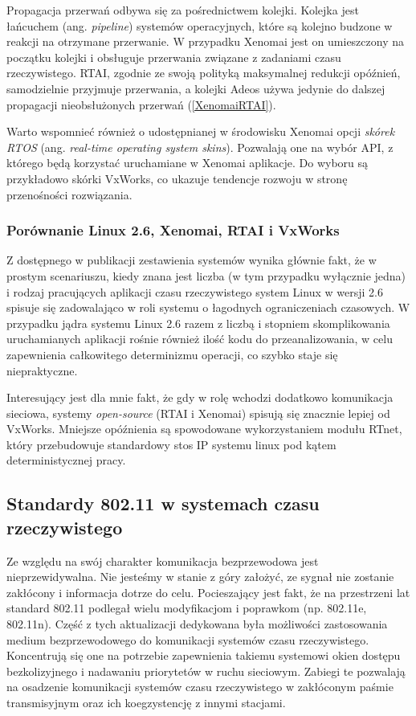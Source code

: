 Propagacja przerwań odbywa się za pośrednictwem kolejki. Kolejka jest łańcuchem (ang. \emph{pipeline}) systemów operacyjnych, które są kolejno budzone w reakcji na otrzymane przerwanie. W przypadku Xenomai jest on umieszczony na początku kolejki i obsługuje przerwania związane z zadaniami czasu rzeczywistego. RTAI, zgodnie ze swoją polityką maksymalnej redukcji opóźnień, samodzielnie przyjmuje przerwania, a kolejki Adeos używa jedynie do dalszej propagacji nieobsłużonych przerwań (\ref{XenomaiRTAI}). 

Warto wspomnieć również o udostępnianej w środowisku Xenomai opcji \emph{skórek RTOS} (ang. \emph{real-time operating system skins}). Pozwalają one na wybór API, z którego będą korzystać uruchamiane w Xenomai aplikacje. Do wyboru są przykładowo skórki VxWorks, co ukazuje tendencje rozwoju w stronę przenośności rozwiązania.

\subsubsection{Porównanie Linux 2.6, Xenomai, RTAI i VxWorks}

Z dostępnego w publikacji \cite{pub:Comparison} zestawienia systemów wynika głównie fakt, że w prostym scenariuszu, kiedy znana jest liczba (w tym przypadku wyłącznie jedna) i rodzaj pracujących aplikacji czasu rzeczywistego system Linux w wersji 2.6 spisuje się zadowalająco w roli systemu o łagodnych ograniczeniach czasowych. W przypadku jądra systemu Linux 2.6 razem z liczbą i stopniem skomplikowania uruchamianych aplikacji rośnie również ilość kodu do przeanalizowania, w celu zapewnienia całkowitego determinizmu operacji, co szybko staje się niepraktyczne.

Interesujący jest dla mnie fakt, że gdy w rolę wchodzi dodatkowo komunikacja sieciowa, systemy \emph{open-source} (RTAI i Xenomai) spisują się znacznie lepiej od VxWorks. Mniejsze opóźnienia są spowodowane wykorzystaniem modułu RTnet, który przebudowuje standardowy stos IP systemu linux pod kątem deterministycznej pracy.


\subsection{Standardy 802.11 w systemach czasu rzeczywistego}

Ze względu na swój charakter komunikacja bezprzewodowa jest nieprzewidywalna. Nie jesteśmy w stanie z góry założyć, ze sygnał nie zostanie zakłócony i informacja dotrze do celu. Pocieszający jest fakt, że na przestrzeni lat standard 802.11 podlegał wielu modyfikacjom i poprawkom (np. 802.11e, 802.11n). Część z tych aktualizacji dedykowana była możliwości zastosowania medium bezprzewodowego do komunikacji systemów czasu rzeczywistego. Koncentrują się one na potrzebie zapewnienia takiemu systemowi okien dostępu bezkolizyjnego i nadawaniu priorytetów w ruchu sieciowym. Zabiegi te pozwalają na osadzenie komunikacji systemów czasu rzeczywistego w zakłóconym paśmie transmisyjnym oraz ich koegzystencję z innymi stacjami. 

